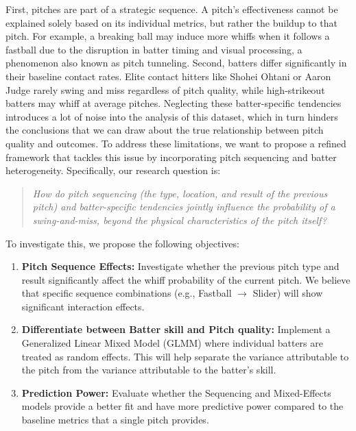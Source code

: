 \documentclass[11pt]{article}
\begin{document}
First, pitches are part of a strategic sequence. A pitch's effectiveness cannot be explained solely based on its individual metrics, but rather the buildup to that pitch. 
For example, a breaking ball may induce more whiffs when it follows a fastball due to the disruption in batter timing and visual processing, a phenomenon also known as pitch tunneling.
Second, batters differ significantly in their baseline contact rates. Elite contact hitters like Shohei Ohtani or Aaron Judge rarely swing and miss regardless of pitch quality, while high-strikeout batters may whiff at average pitches. 
Neglecting these batter-specific tendencies introduces a lot of noise into the analysis of this dataset, which in turn hinders the conclusions that we can draw about the true relationship between pitch quality and outcomes.
To address these limitations, we want to propose a refined framework that tackles this issue by incorporating pitch sequencing and batter heterogeneity. 
Specifically, our research question is:

\begin{quote}
\centering
\textit{How do pitch sequencing (the type, location, and result of the previous pitch) and batter-specific tendencies jointly influence the probability of a swing-and-miss, beyond the physical characteristics of the pitch itself?}
\end{quote}

\noindent
To investigate this, we propose the following objectives:

\begin{enumerate}[leftmargin=3em, label=\textbf{\arabic*.}]
    \item \textbf{Pitch Sequence Effects:} Investigate whether the previous pitch type and result significantly affect the whiff probability of the current pitch. We believe that specific sequence combinations (e.g., Fastball $\rightarrow$ Slider) will show significant interaction effects.
    \item \textbf{Differentiate between Batter skill and Pitch quality:} Implement a Generalized Linear Mixed Model (GLMM) where individual batters are treated as random effects. This will help separate the variance attributable to the pitch from the variance attributable to the batter's skill.
    \item \textbf{Prediction Power:} Evaluate whether the Sequencing and Mixed-Effects models provide a better fit and have more predictive power compared to the baseline metrics that a single pitch provides. 
\end{enumerate}
\end{document}
